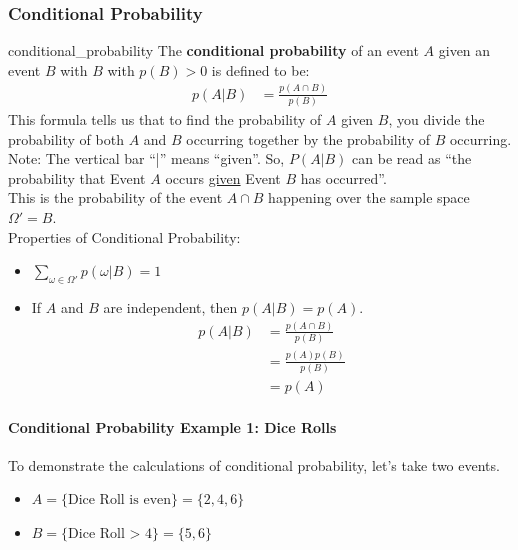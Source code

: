 \documentclass{mlnotes}
\begin{document}
\subsubsection{Conditional Probability}
\begin{definition}{}{conditional_probability}
  The \textbf{conditional probability} of an event \(A\) given an event \(B\)
  with \(B\) with \(p(B) > 0\) is defined to be:
  \begin{align*}
    p(A|B) &= \frac{p(A \cap B)}{p(B)}
  \end{align*}
  This formula tells us that to find the probability of \(A\) given \(B\), you
  divide the probability of both \(A\) and \(B\) occurring together by the
  probability of \(B\) occurring.
  \\[12pt]
  Note: The vertical bar ``|'' means ``given''. So, \(P(A | B)\) can be read as
  ``the probability that Event \(A\) occurs \underline{given} Event \(B\) has
  occurred''.
  \\[12pt]
  This is the probability of the event \(A \cap B\) happening over the sample
  space \(\Omega' = B\).
  \\[12pt]
  Properties of Conditional Probability:
  \begin{itemize}
    \item \(\sum_{\omega \in \Omega'} p(\omega|B) = 1\)
    \item If \(A\) and \(B\) are independent, then \(p(A|B) = p(A)\).
    \begin{align*}
      p(A|B) &= \frac{p(A \cap B)}{p(B)}\\
             &= \frac{p(A)p(B)}{p(B)}\\
             &= p(A)
    \end{align*}
  \end{itemize}
\end{definition}

\paragraph{Conditional Probability Example 1: Dice Rolls}
To demonstrate the calculations of conditional probability, let's take two
events.
\begin{itemize}
  \item \(A = \{\text{Dice Roll is even}\} = \{2,4,6\}\)
  \item \(B = \{\text{Dice Roll > 4}\} = \{5,6\}\)
\end{itemize}
\end{document}
